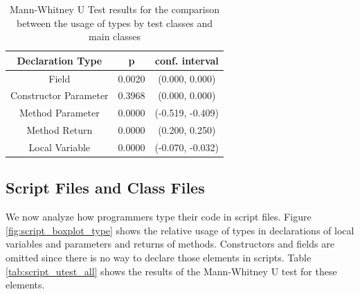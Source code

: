 \documentclass[preprint]{sigplanconf}
\begin{document}
\begin{table}[h!]
\centering{}%
\begin{tabular}{|c|c|c|}
\hline 
Declaration Type 		& p & conf. interval \\
\hline 
\hline 
Field                             & 0.0020		& (0.000, 0.000) \\ \hline
Constructor Parameter  & 0.3968	& (0.000, 0.000) \\ \hline
Method Parameter         & 0.0000	& (-0.519, -0.409) \\ \hline
Method Return              & 0.0000	& (0.200, 0.250) \\ \hline
Local Variable               & 0.0000		& (-0.070, -0.032) \\ 
\hline 
\end{tabular}
\label{tab:test_utest_type}
\caption{Mann-Whitney U Test results for the comparison between the usage of types by test classes and main classes}
\end{table}

\subsection{Script Files and Class Files\label{res-test-scripts}}
We now analyze how programmers type their code in script files.
Figure \ref{fig:script_boxplot_type} shows the relative usage of types in declarations of local variables and parameters and returns of methods.
Constructors and fields are omitted since there is no way to declare those elements in scripts.
Table \ref{tab:script_utest_all} shows the results of the Mann-Whitney U test for these elements.
\end{document}
